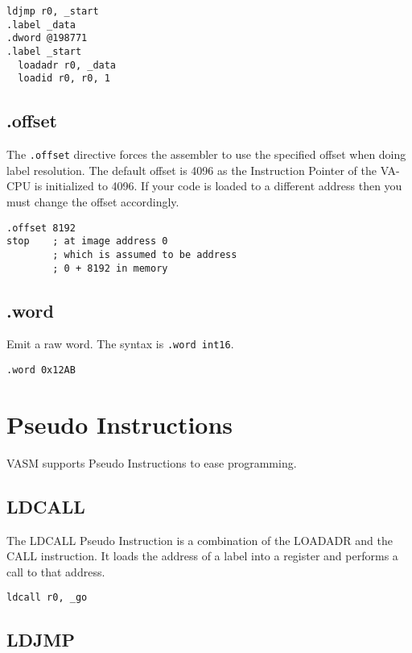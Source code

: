 \begin{verbatim}
ldjmp r0, _start
.label _data
.dword @198771
.label _start
  loadadr r0, _data
  loadid r0, r0, 1
\end{verbatim}

\subsection{.offset}

The \verb|.offset| directive forces the assembler to use the specified offset when doing label resolution. The default offset is 4096 as the Instruction Pointer
of the VA-CPU is initialized to 4096. If your code is loaded to a different address then you must change the offset accordingly. 

\begin{verbatim}
.offset 8192
stop	; at image address 0
        ; which is assumed to be address
        ; 0 + 8192 in memory
\end{verbatim}

\subsection{.word}

Emit a raw word. The syntax is \verb|.word int16|. 

\begin{verbatim}
.word 0x12AB
\end{verbatim}

\section{Pseudo Instructions}

VASM supports Pseudo Instructions to ease programming. 

\subsection{LDCALL}

The LDCALL Pseudo Instruction is a combination of the LOADADR and the CALL instruction. It loads the address of a label into a register and
performs a call to that address. 

\begin{verbatim}
ldcall r0, _go
\end{verbatim}

\subsection{LDJMP}

